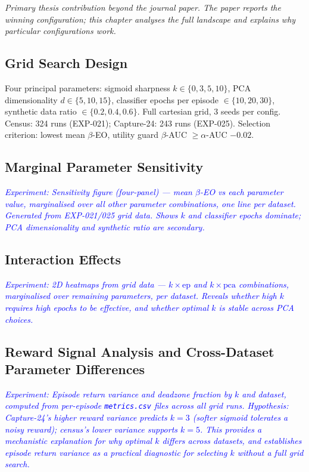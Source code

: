\documentclass[12pt]{article}
\newcommand{\experiment}[1]{\textcolor{blue}{\textit{Experiment: #1}}}
\begin{document}
\textit{Primary thesis contribution beyond the journal paper. The paper reports
the winning configuration; this chapter analyses the full landscape and
explains why particular configurations work.}

\subsection{Grid Search Design}
Four principal parameters: sigmoid sharpness $k \in \{0, 3, 5, 10\}$, PCA
dimensionality $d \in \{5, 10, 15\}$, classifier epochs per episode $\in
\{10, 20, 30\}$, synthetic data ratio $\in \{0.2, 0.4, 0.6\}$. Full
cartesian grid, 3 seeds per config. Census: 324 runs (EXP-021); Capture-24:
243 runs (EXP-025). Selection criterion: lowest mean $\beta$-EO, utility guard
$\beta$-AUC $\geq \alpha$-AUC $- 0.02$.

\subsection{Marginal Parameter Sensitivity}
\experiment{Sensitivity figure (four-panel) --- mean $\beta$-EO vs each
parameter value, marginalised over all other parameter combinations, one line
per dataset. Generated from EXP-021/025 grid data. Shows $k$ and classifier
epochs dominate; PCA dimensionality and synthetic ratio are secondary.}

\subsection{Interaction Effects}
\experiment{2D heatmaps from grid data --- $k \times \text{ep}$ and $k \times
\text{pca}$ combinations, marginalised over remaining parameters, per dataset.
Reveals whether high $k$ requires high epochs to be effective, and whether
optimal $k$ is stable across PCA choices.}

\subsection{Reward Signal Analysis and Cross-Dataset Parameter Differences}
\experiment{Episode return variance and deadzone fraction by $k$ and dataset,
computed from per-episode \texttt{metrics.csv} files across all grid runs.
Hypothesis: Capture-24's higher reward variance predicts $k{=}3$ (softer
sigmoid tolerates a noisy reward); census's lower variance supports $k{=}5$.
This provides a mechanistic explanation for why optimal $k$ differs across
datasets, and establishes episode return variance as a practical diagnostic for
selecting $k$ without a full grid search.}
\end{document}
